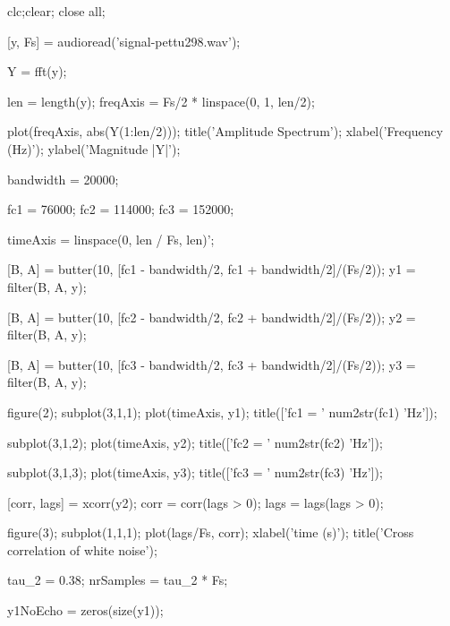 \documentclass[10pt,twocolumn]{article}
\begin{document}
\begin{spverbatim}

clc;clear; close all;

[y, Fs] = audioread('signal-pettu298.wav');

Y = fft(y);

len = length(y);
freqAxis = Fs/2 * linspace(0, 1, len/2);


plot(freqAxis, abs(Y(1:len/2)));
title('Amplitude Spectrum');
xlabel('Frequency (Hz)');
ylabel('Magnitude |Y|');

bandwidth = 20000;     %
   
fc1 = 76000;
fc2 = 114000;
fc3 = 152000;

timeAxis = linspace(0, len / Fs, len)';    

[B, A] = butter(10, [fc1 - bandwidth/2, fc1 + bandwidth/2]/(Fs/2));
y1 = filter(B, A, y);

[B, A] = butter(10, [fc2 - bandwidth/2, fc2 + bandwidth/2]/(Fs/2));
y2 = filter(B, A, y);

[B, A] = butter(10, [fc3 - bandwidth/2, fc3 + bandwidth/2]/(Fs/2));
y3 = filter(B, A, y);

figure(2);
subplot(3,1,1);
plot(timeAxis, y1);
title(['fc1 = ' num2str(fc1) 'Hz']);

subplot(3,1,2);
plot(timeAxis, y2);
title(['fc2 = ' num2str(fc2) 'Hz']);

subplot(3,1,3);
plot(timeAxis, y3);
title(['fc3 = ' num2str(fc3) 'Hz']);


[corr, lags] = xcorr(y2);
corr = corr(lags > 0); %
lags = lags(lags > 0);

figure(3);
subplot(1,1,1);
plot(lags/Fs, corr);
xlabel('time (s)');
title('Cross correlation of white noise');

tau_2 = 0.38;     %
nrSamples = tau_2 * Fs;    %

y1NoEcho = zeros(size(y1));


\end{spverbatim}
\end{document}
